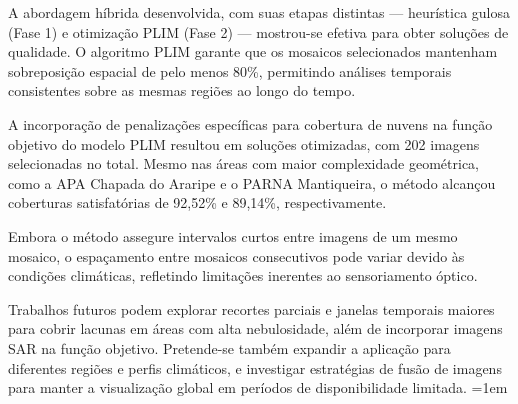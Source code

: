 \documentclass[a4paper,11pt]{article}
\begin{document}
A abordagem híbrida desenvolvida, com suas etapas distintas --- heurística gulosa (Fase 1) e otimização PLIM (Fase 2) --- mostrou-se efetiva para obter soluções de qualidade. O algoritmo PLIM garante que os mosaicos selecionados mantenham sobreposição espacial de pelo menos 80\%, permitindo análises temporais consistentes sobre as mesmas regiões ao longo do tempo.

A incorporação de penalizações específicas para cobertura de nuvens na função objetivo do modelo PLIM resultou em soluções otimizadas, com 202 imagens selecionadas no total. Mesmo nas áreas com maior complexidade geométrica, como a APA Chapada do Araripe e o PARNA Mantiqueira, o método alcançou coberturas satisfatórias de 92,52\% e 89,14\%, respectivamente.

Embora o método assegure intervalos curtos entre imagens de um mesmo mosaico, o espaçamento entre mosaicos consecutivos pode variar devido às condições climáticas, refletindo limitações inerentes ao sensoriamento óptico.

Trabalhos futuros podem explorar recortes parciais e janelas temporais maiores para cobrir lacunas em áreas com alta nebulosidade, além de incorporar imagens SAR na função objetivo. Pretende-se também expandir a aplicação para diferentes regiões e perfis climáticos, e investigar estratégias de fusão de imagens para manter a visualização global em períodos de disponibilidade limitada.
\vspace{-6mm}
\begingroup
  \sloppy
  \emergencystretch=1em
  
  
  \nocite{*}
\endgroup
\end{document}
